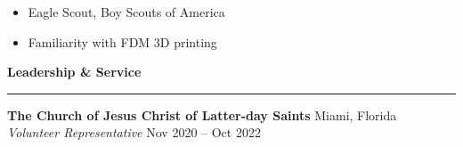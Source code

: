 \documentclass[a4paper,10pt]{article}
\newcommand{\sectionline}{\noindent\rule{\linewidth}{1pt}\vspace{-0.5em}}  %
\begin{document}
\begin{itemize}[noitemsep, topsep=0pt]
    \item Eagle Scout, Boy Scouts of America
    \item Familiarity with FDM 3D printing
\end{itemize}

\textbf{\large Leadership \& Service} \vspace{-1em}\\
\sectionline

\textbf{The Church of Jesus Christ of Latter-day Saints} \hfill Miami, Florida \\
\emph{Volunteer Representative} \hfill Nov 2020 -- Oct 2022
\end{document}
